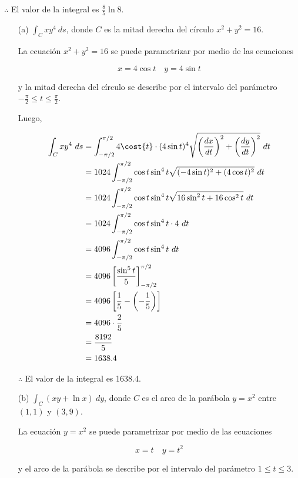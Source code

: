 \documentclass[12pt]{exam}
\begin{document}
\begin{questions}
  $\therefore$ El valor de la integral es $\frac{8}{5} \ln{8}$.


  \begin{enumerate}
    \item[(a)] $\int_C xy^4~ds$, donde $C$ es la mitad derecha del círculo $x^2 + y^2 = 16$.

    La ecuación $x^2 + y^2 = 16$ se puede parametrizar por medio de las ecuaciones

    \[
    x= 4\cos{t} \quad y=4\sin{t}
    \]

    y la mitad derecha del círculo se describe por el intervalo del parámetro $-\frac{\pi}{2} \leq t \leq \frac{\pi}{2}$.

    Luego, 

    \begin{align*}
      \int_C xy^4~ds
      &= \int_{-\pi/2}^{\pi/2} 4\cost{t} \cdot (4\sin{t})^4 \sqrt{\left(\frac{dx}{dt}\right)^2 + \left(\frac{dy}{dt}\right)^2}~dt\\
      &= 1024 \int_{-\pi/2}^{\pi/2} \cos{t}\sin^4{t} \sqrt{(-4\sin{t})^2+(4\cos{t})^2}~dt \\
      &= 1024 \int_{-\pi/2}^{\pi/2} \cos{t}\sin^4{t} \sqrt{16\sin^2{t}+16\cos^2{t}}~dt \\
      &= 1024 \int_{-\pi/2}^{\pi/2} \cos{t}\sin^4{t} \cdot 4~dt \\
      &= 4096 \int_{-\pi/2}^{\pi/2} \cos{t}\sin^4{t}~dt \\
      &= 4096 \left[\frac{\sin^5{t}}{5}\right]_{-\pi/2}^{\pi/2} \\
      &= 4096 \left[\frac{1}{5} - \left(-\frac{1}{5}\right)\right] \\
      &= 4096 \cdot \frac{2}{5}\\
      &= \frac{8192}{5}\\
      &=1638.4
    \end{align*}

    $\therefore$ El valor de la integral es 1638.4.

    \item[(b)] $\int_C(xy+\ln{x})~dy$, donde $C$ es el arco de la parábola $y = x^2$ entre $(1, 1)$ y $(3, 9)$.

    La ecuación $y = x^2$ se puede parametrizar por medio de las ecuaciones

    \[
    x = t \quad y = t^2
    \]

    y el arco de la parábola se describe por el intervalo del parámetro $1 \leq t \leq 3$.


\end{enumerate}
\end{questions}
\end{document}
